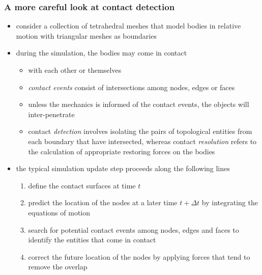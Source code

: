 %
%
%
%


\begin{frame}[fragile]
%
  \frametitle{A more careful look at contact detection}
%
  \begin{itemize}
%
  \item consider a collection of tetrahedral meshes that model bodies in relative motion with
    triangular meshes as boundaries
%
  \item during the simulation, the bodies may come in contact
    \begin{itemize}
    \item with each other or themselves
    \item {\em contact events} consist of intersections among nodes, edges or faces
    \item unless the mechanics is informed of the contact events, the objects will
      inter-penetrate
    \item contact {\em detection} involves isolating the pairs of topological entities from
      each boundary that have intersected, whereas contact {\em resolution} refers to the
      calculation of appropriate restoring forces on the bodies
    \end{itemize}
%
  \item the typical simulation update step proceeds along the following lines
    \begin{enumerate}
    \item define the contact surfaces at time $t$
    \item predict the location of the nodes at a later time $t+\Delta t$ by integrating the
      equations of motion
    \item search for potential contact events among nodes, edges and faces to identify the
      entities that come in contact \label{item:contact-search}
    \item correct the future location of the nodes by applying forces that tend to remove the
      overlap
    \end{enumerate}
%
  \end{itemize}
%
\end{frame}

